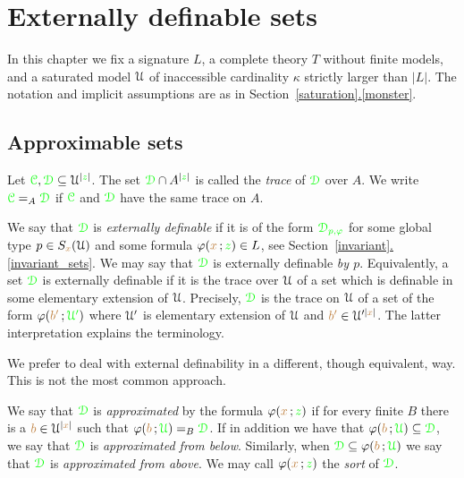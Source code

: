 \documentclass[creche.tex]{subfiles}
\begin{document}
\chapter{Externally definable sets}
\label{external}

\def\medrel#1{\parbox[t]{6ex}{$\displaystyle\hfil #1$}}
\def\ceq#1#2#3{\parbox{25ex}{$\displaystyle #1$}\medrel{#2}$\displaystyle  #3$}



In this chapter we fix a signature $L$, a complete theory $T$ without finite models, and a saturated model $\EuScript U$ of inaccessible cardinality $\kappa$ strictly larger than $|L|$.
The notation and implicit assumptions are as in Section~\hyperref[monster]{\ref*{saturation}.\ref*{monster}}.



\section{Approximable sets}
\label{approximable}

\def\ceq#1#2#3{\parbox{25ex}{$\displaystyle #1$}\medrel{#2}$\displaystyle  #3$}

Let ${\color{green}\EuScript C},{\color{green}\EuScript D}\subseteq\EuScript U^{|{\color{green} z}|}$.
The set ${\color{green}\EuScript D}\cap A^{|{\color{green} z}|}$ is called the \emph{trace\/} of ${\color{green}\EuScript D}$ over $A$.
We write ${\color{green}\EuScript C}=_A{\color{green}\EuScript D}$ if  ${\color{green}\EuScript C}$ and ${\color{green}\EuScript D}$ have the same trace on $A$.

We say that ${\color{green}\EuScript D}$ is \emph{externally definable\/} if it is of the form ${\color{green}\EuScript D_{p,\varphi}}$ for some global type $p\in S_{\color{brown} x}(\EuScript U)$ and some formula $\varphi({\color{brown} x}\,;{\color{green} z})\in L$, see Section~\hyperref[invariant_sets]{\ref*{invariant}.\ref*{invariant_sets}}. We may say that ${\color{green}\EuScript D}$ is externally definable \emph{by $p$}. Equivalently, a set ${\color{green}\EuScript D}$ is externally definable if it is the trace over $\EuScript U$ of a set which is definable in some elementary extension of $\EuScript U$. Precisely, ${\color{green}\EuScript D}$ is the trace on $\EuScript U$ of a set of the form $\varphi({\color{brown} b'}\,;{\color{green}\EuScript U'})$ where $\EuScript U'$ is elementary extension of $\EuScript U$ and ${\color{brown} b'}\in\EuScript U'^{|{\color{brown} x}|}$. The latter interpretation explains the terminology.

\noindent\llap{\textcolor{red}{\Large\danger}\kern1.5ex}We prefer to deal with external definability in a different, though equivalent, way.
This is not the most common approach.

\begin{definition}\label{def_epprox}
We say that ${\color{green}\EuScript D}$ is \emph{approximated\/} by the formula $\varphi({\color{brown} x}\,;{\color{green} z})$ if for every finite $B$ there is a ${\color{brown} b}\in\EuScript U^{|{\color{brown} x}|}$ such that $\varphi({\color{brown} b}\,;{\color{green}\EuScript U})=_B{\color{green}\EuScript D}$.
If in addition we have that $\varphi({\color{brown} b}\,;{\color{green}\EuScript U})\subseteq{\color{green}\EuScript D}$, we say that  ${\color{green}\EuScript D}$ is \emph{approximated from below}.
Similarly, when ${\color{green}\EuScript D}\subseteq\varphi({\color{brown} b}\,;{\color{green}\EuScript U})$ we say that  ${\color{green}\EuScript D}$ is \emph{approximated from above}.
We may call $\varphi({\color{brown} x}\,;{\color{green} z})$ the \emph{sort} of ${\color{green}\EuScript D}$.\QED
\end{definition} 
 
\end{document}

